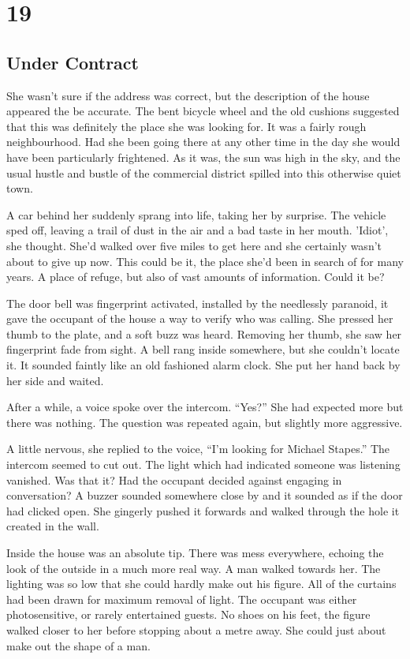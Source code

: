 \chapter{19}
\section{Under Contract}


She wasn't sure if the address was correct, but the description of the house appeared the be accurate.  The bent bicycle wheel and the old cushions suggested that this was definitely the place she was looking for.  It was a fairly rough neighbourhood.  Had she been going there at any other time in the day she would have been particularly frightened.  As it was, the sun was high in the sky, and the usual hustle and bustle of the commercial district spilled into this otherwise quiet town.  

A car behind her suddenly sprang into life, taking her by surprise.  The vehicle sped off, leaving a trail of dust in the air and a bad taste in her mouth.  'Idiot', she thought.  She'd walked over five miles to get here and she certainly wasn't about to give up now.  This could be it, the place she'd been in search of for many years.  A place of refuge, but also of vast amounts of information.  Could it be?

The door bell was fingerprint activated, installed by the needlessly paranoid, it gave the occupant of the house a way to verify who was calling.  She pressed her thumb to the plate, and a soft buzz was heard.  Removing her thumb, she saw her fingerprint fade from sight.  A bell rang inside somewhere, but she couldn't locate it.  It sounded faintly like an old fashioned alarm clock.  She put her hand back by her side and waited.

After a while, a voice spoke over the intercom.  ``Yes?''  She had expected more but there was nothing.  The question was repeated again, but slightly more aggressive.  

A little nervous, she replied to the voice, ``I'm looking for Michael Stapes.''  The intercom seemed to cut out.  The light which had indicated someone was listening vanished.  Was that it?  Had the occupant decided against engaging in conversation?  A buzzer sounded somewhere close by and it sounded as if the door had clicked open.  She gingerly pushed it forwards and walked through the hole it created in the wall.

Inside the house was an absolute tip.  There was mess everywhere, echoing the look of the outside in a much more real way.  A man walked towards her.  The lighting was so low that she could hardly make out his figure.  All of the curtains had been drawn for maximum removal of light.  The occupant was either photosensitive, or rarely entertained guests.  No shoes on his feet, the figure walked closer to her before stopping about a metre away.  She could just about make out the shape of a man.

